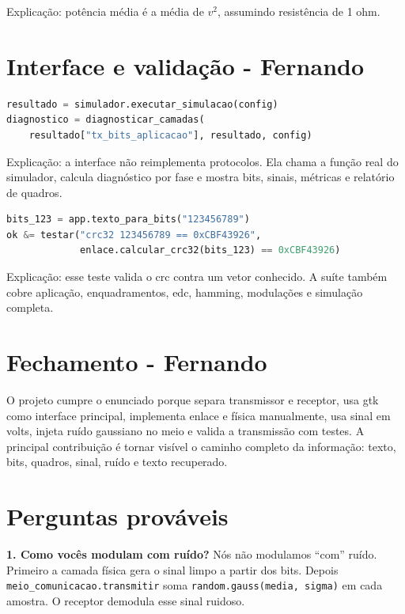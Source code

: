 \documentclass[10pt,a4paper]{article}
\begin{document}
Explicação: potência média é a média de \(v^2\), assumindo resistência de 1
ohm.

\section{Interface e validação - Fernando}

\begin{lstlisting}[language=Python]
resultado = simulador.executar_simulacao(config)
diagnostico = diagnosticar_camadas(
    resultado["tx_bits_aplicacao"], resultado, config)
\end{lstlisting}

Explicação: a interface não reimplementa protocolos. Ela chama a função real
do simulador, calcula diagnóstico por fase e mostra bits, sinais, métricas e
relatório de quadros.

\begin{lstlisting}[language=Python]
bits_123 = app.texto_para_bits("123456789")
ok &= testar("crc32 123456789 == 0xCBF43926",
             enlace.calcular_crc32(bits_123) == 0xCBF43926)
\end{lstlisting}

Explicação: esse teste valida o crc contra um vetor conhecido. A suíte também
cobre aplicação, enquadramentos, edc, hamming, modulações e simulação
completa.

\section{Fechamento - Fernando}

O projeto cumpre o enunciado porque separa transmissor e receptor, usa gtk
como interface principal, implementa enlace e física manualmente, usa sinal em
volts, injeta ruído gaussiano no meio e valida a transmissão com testes. A
principal contribuição é tornar visível o caminho completo da informação:
texto, bits, quadros, sinal, ruído e texto recuperado.

\section{Perguntas prováveis}

\textbf{1. Como vocês modulam com ruído?} Nós não modulamos ``com'' ruído.
Primeiro a camada física gera o sinal limpo a partir dos bits. Depois
\texttt{meio\_comunicacao.transmitir} soma \texttt{random.gauss(media, sigma)}
em cada amostra. O receptor demodula esse sinal ruidoso.
\end{document}

